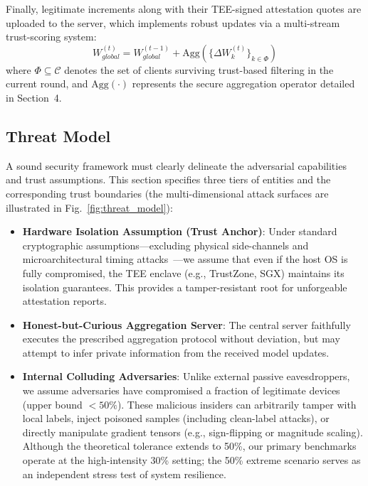 \documentclass[runningheads]{llncs}
\begin{document}
Finally, legitimate increments along with their TEE-signed attestation quotes are uploaded to the server, which implements robust updates via a multi-stream trust-scoring system:
\begin{equation}
W_{global}^{(t)} = W_{global}^{(t-1)} + \mathrm{Agg}(\{ \Delta W_{k}^{(t)} \}_{k\in\Phi})
\end{equation}
where $\Phi \subseteq \mathcal{C}$ denotes the set of clients surviving trust-based filtering in the current round, and $\mathrm{Agg}(\cdot)$ represents the secure aggregation operator detailed in Section~4.


\subsection{Threat Model}
A sound security framework must clearly delineate the adversarial capabilities and trust assumptions. This section specifies three tiers of entities and the corresponding trust boundaries (the multi-dimensional attack surfaces are illustrated in Fig.~\ref{fig:threat_model}):
\begin{itemize}
    \item \textbf{Hardware Isolation Assumption (Trust Anchor)}:
    Under standard cryptographic assumptions---excluding physical side-channels and microarchitectural timing attacks~\cite{zhang2025rppfl}---we assume that even if the host OS is fully compromised, the TEE enclave (e.g., TrustZone, SGX) maintains its isolation guarantees.
    This provides a tamper-resistant root for unforgeable attestation reports.
    \item \textbf{Honest-but-Curious Aggregation Server}: The central server faithfully executes the prescribed aggregation protocol without deviation, but may attempt to infer private information from the received model updates.
    \item \textbf{Internal Colluding Adversaries}: Unlike external passive eavesdroppers, we assume adversaries have compromised a fraction of legitimate devices (upper bound $< 50\%$). These malicious insiders can arbitrarily tamper with local labels, inject poisoned samples (including clean-label attacks), or directly manipulate gradient tensors (e.g., sign-flipping or magnitude scaling). Although the theoretical tolerance extends to 50\%, our primary benchmarks operate at the high-intensity 30\% setting; the 50\% extreme scenario serves as an independent stress test of system resilience.
\end{itemize}
\end{document}
